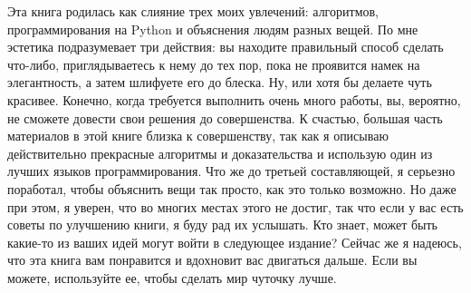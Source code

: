 

Эта книга родилась как слияние трех моих увлечений: алгоритмов, программирования на Python и объяснения людям разных вещей. По мне эстетика подразумевает три действия: вы находите правильный способ сделать что-либо, приглядываетесь к нему до тех пор, пока не проявится намек на элегантность, а затем шлифуете его до блеска. Ну, или хотя бы делаете чуть красивее. Конечно, когда требуется выполнить очень много работы, вы, вероятно, не сможете довести свои решения до совершенства. К счастью, большая часть материалов в этой книге близка к совершенству, так как я описываю действительно прекрасные алгоритмы и доказательства и использую один из лучших языков программирования. Что же до третьей составляющей, я серьезно поработал, чтобы объяснить вещи так просто, как это только возможно. Но даже при этом, я уверен, что во многих местах этого не достиг, так что если у вас есть советы по улучшению книги, я буду рад их услышать. Кто знает, может быть какие-то из ваших идей могут войти в следующее издание? Сейчас же я надеюсь, что эта книга вам понравится и вдохновит вас двигаться дальше. Если вы можете, используйте ее, чтобы сделать мир чуточку лучше.
